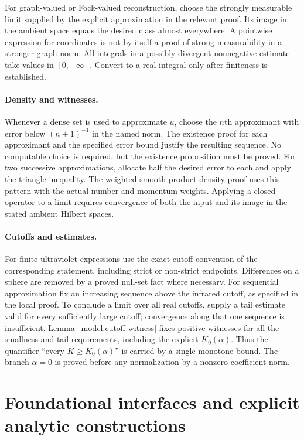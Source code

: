 \documentclass[11pt,a4paper]{article}
\theoremstyle{definition}
\theoremstyle{remark}
\begin{document}
For graph-valued or Fock-valued reconstruction, choose the strongly
measurable limit supplied by the explicit approximation in the
relevant proof. Its image in the ambient space equals the desired
class almost everywhere. A pointwise expression for coordinates is
not by itself a proof of strong measurability in a stronger graph norm.
All integrals in a possibly divergent nonnegative estimate take
values in $[0,+\infty]$. Convert to a real integral only after
finiteness is established.

\paragraph{Density and witnesses.}
Whenever a dense set is used to approximate $u$, choose the $n$th
approximant with error below $(n+1)^{-1}$ in the named norm.
The existence proof for each approximant and the specified error
bound justify the resulting sequence. No computable choice is
required, but the existence proposition must be proved. For two
successive approximations, allocate half the desired error to each
and apply the triangle inequality. The weighted smooth-product
density proof uses this pattern with the actual number and momentum
weights. Applying a closed operator to a limit requires convergence
of both the input and its image in the stated ambient Hilbert spaces.

\paragraph{Cutoffs and estimates.}
For finite ultraviolet expressions use the exact cutoff convention
of the corresponding statement, including strict or non-strict
endpoints. Differences on a sphere are removed by a proved null-set
fact where necessary. For sequential approximation fix an increasing
sequence above the infrared cutoff, as specified in the local proof.
To conclude a limit over all real cutoffs, supply a tail estimate
valid for every sufficiently large cutoff; convergence along that
one sequence is insufficient. Lemma~\ref{model:cutoff-witness}
fixes positive witnesses for all the smallness and tail requirements,
including the explicit $K_0(\alpha)$. Thus the quantifier
``every $K\geq K_0(\alpha)$'' is carried by a single monotone bound.
The branch $\alpha=0$ is proved before any normalization by a
nonzero coefficient norm.

\section{Foundational interfaces and explicit analytic constructions}
\label{sec:foundations}
\end{document}
